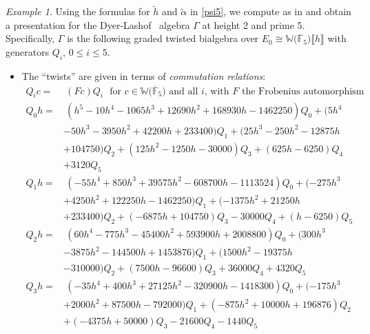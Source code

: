\documentclass{gtpart}
\theoremstyle{definition}
\theoremstyle{remark}
\newtheorem{ex}[thm]{Example}
\newcommand{\mb}[1]{\mathbb{#1}}
\newcommand{\cF}{\overline {\mb F}}
\newcommand{\DL}{Dyer-Lashof~}
\newcommand{\BW}{{\mb W}}
\newcommand{\A}{\alpha}
\newcommand{\G}{\Gamma}
\newcommand{\lb}{\llbracket}
\newcommand{\rb}{\rrbracket}
\renewcommand{\=}{\approx}
\renewcommand{\-}{\sim}
\numberwithin{equation}{section}
\numberwithin{thm}{section}
\begin{document}
\begin{ex}
 \label{ex:gamma}
 Using the formulas for $\widetilde{h}$ and $\widetilde{\A}$ in \eqref{psi5}, we 
 compute as in \cite[Proposition 3.6]{p3} and obtain a presentation for the \DL 
 algebra $\G$ at height 2 and prime 5.  Specifically, $\G$ is the following 
 graded twisted bialgebra over $E_0 \cong \BW \big( \cF_5 \big) \lb h \rb$ with 
 generators $Q_i$, $0 \leq i \leq 5$.  

 \begin{itemize}
  \item The ``twists'' are given in terms of {\em commutation relations}: 
  \begin{equation*}
   \begin{split}
    Q_i c = & ~ (F c) Q_i ~~~ \text{for $c \in \BW \big( \cF_5 \big)$ and all 
              $i$, with $F$ the Frobenius automorphism} \\
    Q_0 h = & ~ (h^5 - 10 h^4 - 1065 h^3 + 12690 h^2 + 168930 h - 1462250) Q_0 + (5 h^4 \\
            & - 50 h^3 - 3950 h^2 + 42200 h + 233400) Q_1 + (25 h^3 - 250 h^2 - 12875 h \\
            & + 104750) Q_2 + (125 h^2 - 1250 h - 30000) Q_3 + (625 h - 6250) Q_4 \\
            & + 3120 Q_5 \\
    Q_1 h = & ~ (-55 h^4 + 850 h^3 + 39575 h^2 - 608700 h - 1113524) Q_0 + (-275 h^3 \\
            & + 4250 h^2 + 122250 h - 1462250) Q_1 + (-1375 h^2 + 21250 h \\
            & + 233400) Q_2 + (-6875 h + 104750) Q_3 - 30000 Q_4 + (h - 6250) Q_5 \\
    Q_2 h = & ~ (60 h^4 - 775 h^3 - 45400 h^2 + 593900 h + 2008800) Q_0 + (300 h^3 \\
            & - 3875 h^2 - 144500 h + 1453876) Q_1 + (1500 h^2 - 19375 h \\
            & - 310000) Q_2 + (7500 h - 96600) Q_3 + 36000 Q_4 + 4320 Q_5 
   \end{split}
  \end{equation*}
  \begin{equation*}
   \begin{split}
    Q_3 h = & ~ (-35 h^4 + 400 h^3 + 27125 h^2 - 320900 h - 1418300) Q_0 + (-175 h^3 \\
            & + 2000 h^2 + 87500 h - 792000) Q_1 + (-875 h^2 + 10000 h + 196876) Q_2 \\
            & + (-4375 h + 50000) Q_3 - 21600 Q_4 - 1440 Q_5 \\

\end{split}
\end{equation*}
\end{itemize}
\end{ex}
\end{document}
